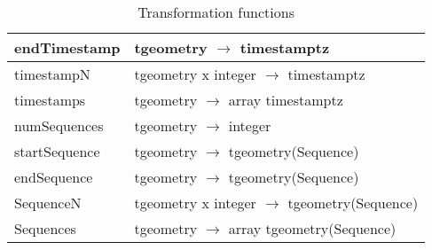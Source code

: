 \begin{table}[h!]
\begin{tabularx}{\textwidth}{|l|X|}
    endTimestamp        & tgeometry $\rightarrow$ timestamptz \\
    \hline
    timestampN          & tgeometry x integer $\rightarrow$ timestamptz \\
    \hline
    timestamps          & tgeometry $\rightarrow$ array timestamptz \\
    \hline
    numSequences        & tgeometry $\rightarrow$ integer \\
    \hline
    startSequence       & tgeometry $\rightarrow$ tgeometry(Sequence) \\
    \hline
    endSequence         & tgeometry $\rightarrow$ tgeometry(Sequence) \\
    \hline
    SequenceN           & tgeometry x integer $\rightarrow$ tgeometry(Sequence) \\
    \hline
    Sequences           & tgeometry $\rightarrow$ array tgeometry(Sequence) \\
    \hline
    \end{tabularx}
    \caption{Transformation functions}
    \label{table:transformation_funcs_complete}
\end{table}